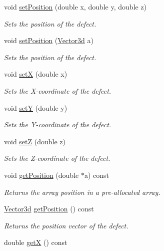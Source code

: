 \begin{DoxyCompactItemize}
void \hyperlink{classDefect_ad1a6acd8399d2ecabb7ce2b77623bbec}{set\-Position} (double x, double y, double z)
\begin{DoxyCompactList}\small\item\em Sets the position of the defect. \end{DoxyCompactList}\item 
void \hyperlink{classDefect_a36ffa9b4b01d38ed8a95ca2c78973cc4}{set\-Position} (\hyperlink{classVector3d}{Vector3d} a)
\begin{DoxyCompactList}\small\item\em Sets the position of the defect. \end{DoxyCompactList}\item 
void \hyperlink{classDefect_a5a65f73da6a572d9e7109b31239e441d}{set\-X} (double x)
\begin{DoxyCompactList}\small\item\em Sets the X-\/coordinate of the defect. \end{DoxyCompactList}\item 
void \hyperlink{classDefect_a268606391a4eaee3de029d2005648b6f}{set\-Y} (double y)
\begin{DoxyCompactList}\small\item\em Sets the Y-\/coordinate of the defect. \end{DoxyCompactList}\item 
void \hyperlink{classDefect_abb0b16c44a1b04d782f5c5f598b49d5b}{set\-Z} (double z)
\begin{DoxyCompactList}\small\item\em Sets the Z-\/coordinate of the defect. \end{DoxyCompactList}\item 
void \hyperlink{classDefect_a2bfcc6736a19eb9c4c8803ea0ea1e3f7}{get\-Position} (double $\ast$a) const 
\begin{DoxyCompactList}\small\item\em Returns the array position in a pre-\/allocated array. \end{DoxyCompactList}\item 
\hyperlink{classVector3d}{Vector3d} \hyperlink{classDefect_ad175c3f2b1fad6be48806dab69dfb32e}{get\-Position} () const 
\begin{DoxyCompactList}\small\item\em Returns the position vector of the defect. \end{DoxyCompactList}\item 
double \hyperlink{classDefect_a6e331ddeabd92e2edc124e6697d3bf7d}{get\-X} () const 

\end{DoxyCompactItemize}
